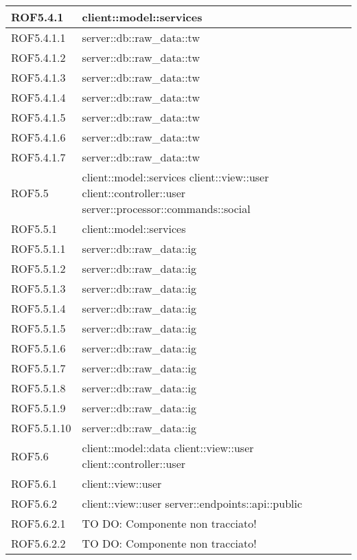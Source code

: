 \begin{center}
\begin{longtable}{| p{4cm} | p{8cm} |}
\hline
ROF5.4.1 & client::model::services \\
\hline
ROF5.4.1.1 & server::db::raw\_data::tw \\
\hline
ROF5.4.1.2 & server::db::raw\_data::tw \\
\hline
ROF5.4.1.3 & server::db::raw\_data::tw \\
\hline
ROF5.4.1.4 & server::db::raw\_data::tw \\
\hline
ROF5.4.1.5 & server::db::raw\_data::tw \\
\hline
ROF5.4.1.6 & server::db::raw\_data::tw \\
\hline
ROF5.4.1.7 & server::db::raw\_data::tw \\
\hline
ROF5.5 & client::model::services \newline client::view::user \newline client::controller::user \newline server::processor::commands::social \\
\hline
ROF5.5.1 & client::model::services \\
\hline
ROF5.5.1.1 & server::db::raw\_data::ig \\
\hline
ROF5.5.1.2 & server::db::raw\_data::ig \\
\hline
ROF5.5.1.3 & server::db::raw\_data::ig \\
\hline
ROF5.5.1.4 & server::db::raw\_data::ig \\
\hline
ROF5.5.1.5 & server::db::raw\_data::ig \\
\hline
ROF5.5.1.6 & server::db::raw\_data::ig \\
\hline
ROF5.5.1.7 & server::db::raw\_data::ig \\
\hline
ROF5.5.1.8 & server::db::raw\_data::ig \\
\hline
ROF5.5.1.9 & server::db::raw\_data::ig \\
\hline
ROF5.5.1.10 & server::db::raw\_data::ig \\
\hline
ROF5.6 & client::model::data \newline client::view::user \newline client::controller::user \\
\hline
ROF5.6.1 & client::view::user \\
\hline
ROF5.6.2 & client::view::user \newline server::endpoints::api::public \\
\hline
ROF5.6.2.1 & TO DO: Componente non tracciato! \\
\hline
ROF5.6.2.2 & TO DO: Componente non tracciato! \\

\end{longtable}
\end{center}
